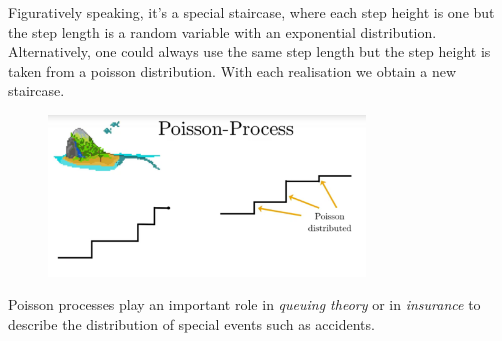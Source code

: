 \documentclass[12pt, a4paper]{scrartcl}
\begin{document}
Figuratively speaking, it’s a special staircase, where each step height is one but the step length is a random variable with an exponential distribution. Alternatively, one could always use the same step length but the step height is taken from a poisson distribution. With each realisation we obtain a new staircase.%
 \begin{figure}[H]
	\centering
	\includegraphics[width=0.75\textwidth]{5_11.png}
\end{figure}
Poisson processes play an important role in \textit{queuing theory} or in \textit{insurance} to describe the distribution of special events such as accidents.\\
\end{document}
